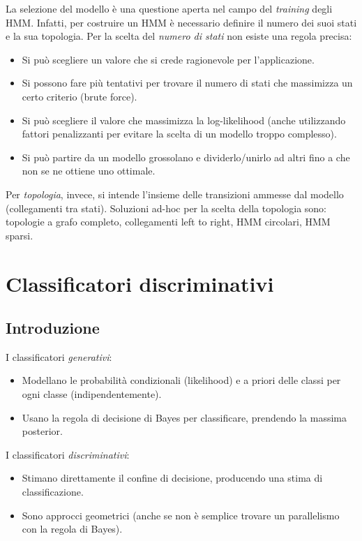\documentclass[a4paper,oneside,titlepage]{book}
\begin{document}
La selezione del modello è una questione aperta nel campo del \textit{training} degli HMM. Infatti, per costruire un HMM è necessario definire il numero dei suoi stati e la sua topologia. Per la scelta del \textit{numero di stati} non esiste una regola precisa:
\begin{itemize}
    \item Si può scegliere un valore che si crede ragionevole per l'applicazione.
    \item Si possono fare più tentativi per trovare il numero di stati che massimizza un certo criterio (brute force).
    \item Si può scegliere il valore che massimizza la log-likelihood (anche utilizzando fattori penalizzanti per evitare la scelta di un modello troppo complesso).
    \item Si può partire da un modello grossolano e dividerlo/unirlo ad altri fino a che non se ne ottiene uno ottimale.
\end{itemize}
Per \textit{topologia}, invece, si intende l'insieme delle transizioni ammesse dal modello (collegamenti tra stati). Soluzioni ad-hoc per la scelta della topologia sono: topologie a grafo completo, collegamenti left to right, HMM circolari, HMM sparsi.


\chapter{Classificatori discriminativi}

\section{Introduzione}
I classificatori \textit{generativi}:
\begin{itemize}
    \item Modellano le probabilità condizionali (likelihood) e a priori delle classi per ogni classe (indipendentemente).
    \item Usano la regola di decisione di Bayes per classificare, prendendo la massima posterior.
\end{itemize}
I classificatori \textit{discriminativi}:
\begin{itemize}
    \item Stimano direttamente il confine di decisione, producendo una stima di classificazione.
    \item Sono approcci geometrici (anche se non è semplice trovare un parallelismo con la regola di Bayes).
\end{itemize}
\end{document}
